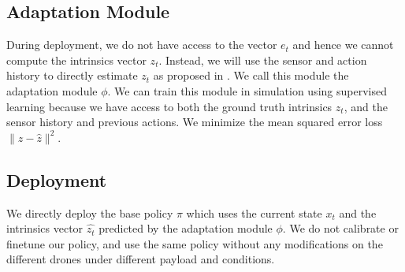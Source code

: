 \subsection{Adaptation Module}
During deployment, we do not have access to the vector $e_t$ and hence we cannot compute the intrinsics vector $z_t$. Instead, we will use the sensor and action history to directly estimate $z_t$ as proposed in \cite{kumar2021rma}. We call this module the adaptation module $\phi$. We can train this module in simulation using supervised learning because we have access to both the ground truth intrinsics $z_t$, and the sensor history and previous actions. We minimize the mean squared error loss $\lVert z - \hat{z} \rVert ^2$.  

\subsection{Deployment}
We directly deploy the base policy $\pi$ which uses the current state $x_t$ and the intrinsics vector $\hat{z_t}$ predicted by the adaptation module $\phi$. We do not calibrate or finetune our policy, and use the same policy without any modifications on the different drones under different payload and conditions.